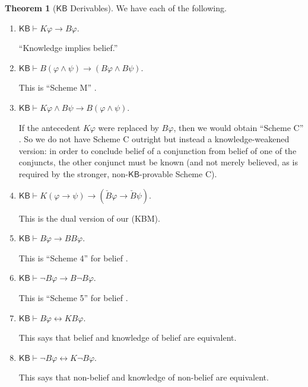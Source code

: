 \documentclass[12pt]{article}
\theoremstyle{definition}
\newtheorem{theorem}{Theorem}[section]
\newcommand{\KB}{{\mathsf{KB}}}                 %
\begin{document}
\begin{theorem}[$\KB$ Derivables]
  \label{theorem:KBgt-derivables}
  We have each of the following.
  \begin{enumerate}
  \item $\KB\vdash K\varphi\to B\varphi$.
    \label{derivables:KBC}

    ``Knowledge implies belief.''

  \item $\KB\vdash B(\varphi\land\psi)\to(B\varphi\land B\psi)$.
    \label{derivables:Band-andB}

    This is ``Scheme M'' \cite[Ch.~8]{Chellas:ml}.

  \item $\KB\vdash K\varphi\land B\psi\to B(\varphi\land\psi)$.
    \label{derivables:andB-Band}

    If the antecedent $K\varphi$ were replaced by $B\varphi$, then we
    would obtain ``Scheme C'' \cite[Ch.~8]{Chellas:ml}.  So we do not
    have Scheme C outright but instead a knowledge-weakened version:
    in order to conclude belief of a conjunction from belief of one of
    the conjuncts, the other conjunct must be known (and not merely
    believed, as is required by the stronger, non-$\KB$-provable
    Scheme C).

  \item $\KB\vdash K(\varphi\to\psi)\to(\check B\varphi\to\check B\psi)$.
    \label{derivables:check-M}

    This is the dual version of our (KBM).

    \item $\KB\vdash B\varphi\to BB\varphi$.
    \label{derivables:pos-belief}

    This is ``Scheme 4'' for belief \cite[Ch.~8]{Chellas:ml}.

  \item $\KB\vdash \lnot B\varphi\to B\lnot B\varphi$.
    \label{derivables:neg-belief}

    This is ``Scheme 5'' for belief \cite[Ch.~8]{Chellas:ml}.

  \item $\KB\vdash B\varphi\leftrightarrow KB\varphi$.
    \label{derivables:B-KB}

    This says that belief and knowledge of belief are equivalent.

  \item $\KB\vdash \lnot B\varphi\leftrightarrow K\lnot B\varphi$.
    \label{derivables:nB-KnB}

    This says that non-belief and knowledge of non-belief are equivalent.


\end{enumerate}
\end{theorem}
\end{document}
